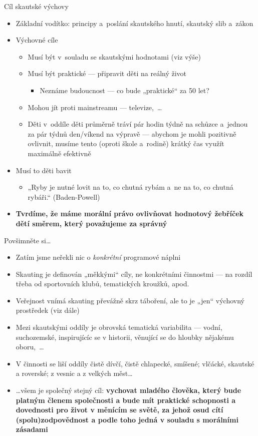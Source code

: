 \documentclass[compress, ucs, xelatex, xcolor=dvipsnames, print,
  hyperref={
    bookmarks=true,
    unicode=true,
    colorlinks=true,
    plainpages=false,
    pdfkeywords={Junak, Pedagogika, Skaut, Skauting, Vychovna metoda},
    linkcolor=Black,
    anchorcolor=Black,
    citecolor=OliveGreen,
    filecolor=OliveGreen,
    menucolor=Black,
    urlcolor=OliveGreen,
    pdftex}
  ]{beamer}
\begin{document}
\begin{frame}{Cíl skautské výchovy}
  \begin{itemize}
    \item Základní vodítko: principy a~poslání skautského hnutí, skautský slib a~zákon
    \item Výchovné cíle
    \begin{itemize}
      \item Musí být v~souladu se skautskými hodnotami (viz výše)
      \item Musí být praktické --- připravit děti na reálný život
      \begin{itemize}
	\item Neznáme budoucnost --- co bude „praktické“ za 50 let?
      \end{itemize}
      \item Mohou jít proti mainstreamu --- televize,~\ldots
      \item Děti v~oddíle děti průměrně tráví pár hodin týdně na schůzce a~jednou za pár týdnů den/víkend na výpravě --- abychom je mohli pozitivně ovlivnit, musíme tento (oproti škole a~rodině) krátký čas využít maximálně efektivně
    \end{itemize}
    \item Musí to děti bavit
      \begin{itemize}
	\item „Ryby je nutné lovit na to, co chutná rybám a~ne na to, co chutná rybáři.“ (Baden-Powell)
      \end{itemize}
    \item \textbf{Tvrdíme, že máme morální právo ovlivňovat hodnotový žebříček dětí směrem, který považujeme za správný}
  \end{itemize}
\end{frame}

\begin{frame}{Povšimněte si\ldots}
  \begin{itemize}
    \item Zatím jsme neřekli nic o \textit{konkrétní} programové náplni
    \item Skauting je definován „měkkými“ cíly, ne konkrétními činnostmi --- na rozdíl třeba od sportovních klubů, tematických kroužků, apod.
    \item Veřejnost vnímá skauting převážně skrz táboření, ale to je „jen“ výchovný prostředek (viz dále)
    \item Mezi skautskými oddíly je obrovská tematická variabilita --- vodní, suchozemské, inspirujícíc se v historii, věnující se do hloubky nějakému oboru,~\ldots
    \item V činnosti se liší oddíly čistě dívčí, čistě chlapecké, smíšené; vlčácké, skautské a roverské; z vesnic a z velkých měst\ldots
    \item \ldots všem je společný stejný cíl: \textbf{vychovat mladého člověka, který bude platným členem společnosti a bude mít praktické schopnosti a dovednosti pro život v měnícím se světě, za jehož osud cítí (spolu)zodpovědnost a podle toho jedná v souladu s morálními zásadami}
  \end{itemize}
\end{frame}
\end{document}
